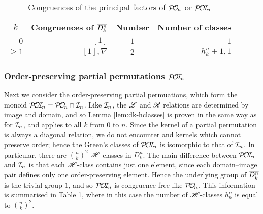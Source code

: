 \begin{table}[h]
  \centering
  \renewcommand{\arraystretch}{1.3}
  \begin{tabular}{| r | r | c | r |}
    \hline
    \multicolumn{1}{|c|}{$k$}
    & \multicolumn{1}{c|}{\textbf{Congruences of $\overline{D_k^n}$}}
    & \textbf{Number}
    & \multicolumn{1}{c|}{\textbf{Number of classes}} \\
    \hline
    $0$ & $[1]$ & $1$ & $1$ \\
    $\geq 1$
    & $[1], \nabla$
    & $2$
    & $h_k^n + 1, 1$ \\
    \hline
  \end{tabular}
  \caption{Congruences of the principal factors of $\mathcal{P\!O\!}_n$ or
    $\mathcal{P\!O\!I\!}_n$}
  \label{tab:dkstar-congs-pon}
\end{table}

\subsubsection{Order-preserving partial permutations $\mathcal{P\!O\!I\!}_n$}
\label{sec:princfact-poin}
Next we consider the order-preserving partial permuations, which form the monoid
$\mathcal{P\!O\!I\!}_n = \mathcal{P\!O\!}_n \cap \mathcal{I}_n$.  Like $\mathcal{I}_n$, the $\mathrel{\mathscr{L}}$ and $\mathrel{\mathscr{R}}$ relations are
determined by image and domain, and so Lemma \ref{lem:dk-hclasses} is proven in
the same way as for $\mathcal{I}_n$, and applies to all $k$ from $0$ to $n$.  Since the
kernel of a partial permutation is always a diagonal relation, we do not
encounter and kernels which cannot preserve order; hence the Green's classes of
$\mathcal{P\!O\!I\!}_n$ is isomorphic to that of $\mathcal{I}_n$.  In particular, there are
$\binom{n}{k}^2$ $\mathrel{\mathscr{H}}$-classes in $D_k^n$.  The main difference between $\mathcal{P\!O\!I\!}_n$
and $\mathcal{I}_n$ is that each $\mathrel{\mathscr{H}}$-class contains just one element, since each
domain--image pair defines only one order-preserving element.  Hence the
underlying group of $\overline{D_k^n}$ is the trivial group $1$, and so $\mathcal{P\!O\!I\!}_n$ is
congruence-free like $\mathcal{P\!O\!}_n$.  This information is summarised in Table
\ref{tab:dkstar-congs-pon}, where in this case the number of $\mathrel{\mathscr{H}}$-classes
$h_k^n$ is equal to $\binom{n}{k}^2$.

